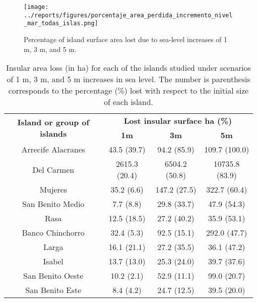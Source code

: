 \documentclass{article} %
\begin{document}
\begin{figure}
  \begin{center}
  \texttt{[image: ../reports/figures/porcentaje\_area\_perdida\_incremento\_nivel\_mar\_todas\_islas.png]}
  \caption{Percentage of island surface area lost due to sea-level increases of 1 m, 3 m, and 5 m.}
  \label{fig:surface}
  \end{center}
\end{figure}


\begin{table}
\caption{Insular area loss (in ha) for each of the islands studied under scenarios of 1 m, 3 m, and 5 m increases in sea level. The number is parenthesis corresponds to the percentage (\%) lost with respect to the initial size of each island.}
\vspace{2mm}
\begin{center}
\begin{tabular}{cccc}
\hline 
\multirow{2}{*}{\textbf{Island or group of islands}} & \multicolumn{3}{c}{\textbf{Lost insular surface ha (\%)}}\\ 
 & \textbf{1m} & \textbf{3m} & \textbf{5m} \\ 
\hline 
Arrecife Alacranes & 43.5 (39.7) & 94.2 (85.9) & 109.7 (100.0) \\ 

Del Carmen & 2615.3 (20.4) & 6504.2 (50.8) & 10735.8 (83.9) \\ 

Mujeres & 35.2 (6.6) & 147.2 (27.5) & 322.7 (60.4) \\ 
 
San Benito Medio & 7.7 (8.8) & 29.8 (33.7) & 47.9 (54.3) \\ 

Rasa & 12.5 (18.5) & 27.2 (40.2) & 35.9 (53.1) \\ 

Banco Chinchorro & 32.4 (5.3) & 92.5 (15.1) & 292.0 (47.7) \\ 

Larga & 16.1 (21.1) & 27.2 (35.5) & 36.1 (47.2) \\ 

Isabel & 13.7 (13.0) & 25.3 (24.0) & 39.7 (37.6) \\ 

San Benito Oeste & 10.2 (2.1) & 52.9 (11.1) & 99.0 (20.7) \\ 

San Benito Este & 8.4 (4.2) & 24.7 (12.5) & 39.5 (20.0) \\ 


\end{tabular}
\end{center}
\end{table}
\end{document}
